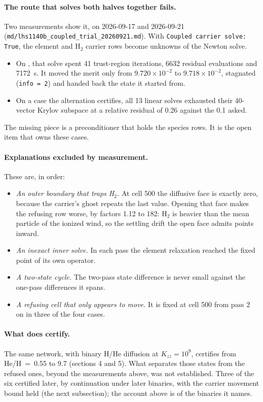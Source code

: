 \documentclass[11pt]{my_memo}
\newcommand{\case}[1]{\seqsplit{#1}}
\begin{document}
\paragraph{The route that solves both halves together fails.} Two
measurements show it, on 2026-09-17 and 2026-09-21
(\texttt{md/lhs1140b\_coupled\_trial\_20260921.md}). With
\texttt{Coupled carrier solve: True}, the element and H$_2$ carrier rows
become unknowns of the Newton solve.
\begin{itemize}
\item On \case{kzz1e9/HeH0.083}, that solve spent 41 trust-region
      iterations, 6632 residual evaluations and 7172~s. It moved the merit
      only from $9.720\times10^{-2}$ to $9.718\times10^{-2}$, stagnated
      (\texttt{info~=~2}) and handed back the state it started from.
\item On a case the alternation certifies, all 13 linear solves exhausted
      their 40-vector Krylov subspace at a relative residual of 0.26 against
      the 0.1 asked.
\end{itemize}
The missing piece is a preconditioner that holds the species rows. It is
the open item that owns these cases.

\paragraph{Explanations excluded by measurement.} These are, in order:
\begin{itemize}
\item \emph{An outer boundary that traps H$_2$.} At cell 500 the diffusive
      face is exactly zero, because the carrier's ghost repeats the last
      value. Opening that face makes the refusing row worse, by factors 1.12
      to 182: H$_2$ is heavier than the mean particle of the ionized wind,
      so the settling drift the open face admits points inward.
\item \emph{An inexact inner solve.} In each pass the element relaxation
      reached the fixed point of its own operator.
\item \emph{A two-state cycle.} The two-pass state difference is never small
      against the one-pass differences it spans.
\item \emph{A refusing cell that only appears to move.} It is fixed at
      cell 500 from pass 2 on in three of the four cases.
\end{itemize}

\paragraph{What does certify.} The same network, with binary H/He
diffusion at $K_{zz}=10^{9}$, certifies from He/H~=~0.55 to 9.7 (sections 4
and 5). What separates those states from the refused ones, beyond the
measurements above, was not established. Three of the six certified later,
by continuation under later binaries, with the carrier movement bound held
(the next subsection); the account above is of the binaries it names.
\end{document}
